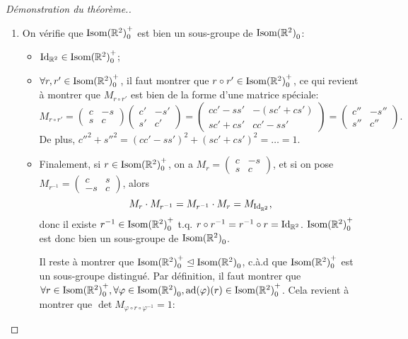 \documentclass{book}
\numberwithin{equation}{section}
\renewcommand{\phi}{\varphi}
\providecommand{\plan}{{\mathbb R^2}}
\providecommand{\id}{{\textnormal{Id}}}
\providecommand{\IdR}{{\id_\plan}}
\providecommand{\isom}{{\textnormal{Isom}(\plan)}}
\providecommand{\isomo}{{\isom_0}}
\providecommand{\isomop}{\isom_0^+}
\providecommand{\ad}{{\textnormal{ad}}}
\providecommand{\subgroupnormaleq}{\trianglelefteq}
\begin{document}
\begin{proof}[Démonstration du théorème.]
	\begin{enumerate}
		\item On vérifie que $\isomop$ est bien un sous-groupe de $\isomo$:
		\begin{itemize}
			\item $\IdR \in \isomop$;
			\item $\forall r, r' \in \isomop$, il faut montrer que $r \circ r' \in \isomop$, ce qui revient à montrer que $M_{r \circ r'}$ est bien de la forme d'une matrice spéciale:
			\begin{equation*}
				M_{r \circ r'} = \begin{pmatrix}
					c & -s \\
					s & c
				\end{pmatrix} \begin{pmatrix}
					c' & -s' \\
					s' & c'
				\end{pmatrix} = \begin{pmatrix}
					cc'-ss' & -(sc' + cs') \\
					sc' + cs' & cc' - ss'
				\end{pmatrix} = \begin{pmatrix}
					c'' & -s'' \\
					s'' & c''
				\end{pmatrix}.
			\end{equation*}
			De plus, $c''^2 + s''^2 = (cc' - ss')^2 + (sc' + cs')^2 = \ldots = 1$.
			\item Finalement, si $r \in \isomop$, on a $M_r = \left(\begin{smallmatrix} c&-s \\ s&c \end{smallmatrix}\right)$, et si on pose $M_{r^{-1}} = \left(\begin{smallmatrix} c & s \\ -s & c \end{smallmatrix}\right)$, alors
			\begin{equation*}
				M_r \cdot M_{r^{-1}} = M_{r^{-1}} \cdot M_r = M_\IdR,
			\end{equation*}
			donc il existe $r^{-1} \in \isomop$ t.q. $r \circ r^{-1} = r^{-1} \circ r = \IdR$.
			$\isomop$ est donc bien un sous-groupe de $\isomo$. \par
			Il reste à montrer que $\isomop \subgroupnormaleq \isomo$, c.à.d que $\isomop$ est un sous-groupe distingué. Par définition, il faut montrer que $\forall r \in \isomop, \forall \phi \in \isomo, \ad(\phi)(r) \in \isomop$. Cela revient à montrer que $\det M_{\phi \circ r \circ \phi^{-1}} = 1$:

\end{itemize}
\end{enumerate}
\end{proof}
\end{document}
